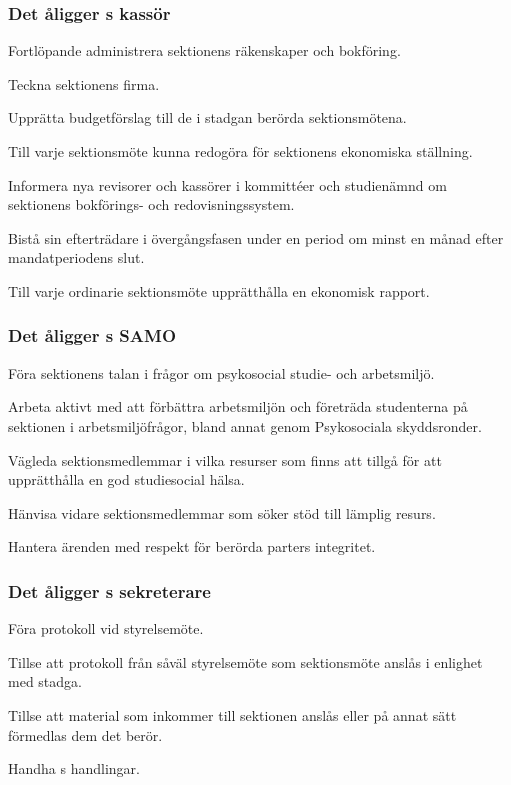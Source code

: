 \subsubsection{Det åligger \STYRIT{}s kassör}
\begin{att}
	\item Fortlöpande administrera sektionens räkenskaper och bokföring.
	\item Teckna sektionens firma.
	\item Upprätta budgetförslag till de i stadgan berörda sektionsmötena.
	\item Till varje sektionsmöte kunna redogöra för sektionens ekonomiska ställning.
	\item Informera nya revisorer och kassörer i kommittéer och studienämnd om sektionens bokförings- och redovisningssystem.
    \item Bistå sin efterträdare i övergångsfasen under en period om minst en månad efter mandatperiodens slut.
    \item Till varje ordinarie sektionsmöte upprätthålla en ekonomisk rapport.
\end{att}

\subsubsection{Det åligger \STYRIT{}s SAMO}
\begin{att}
    \item Föra sektionens talan i frågor om psykosocial studie- och arbetsmiljö.
    \item Arbeta aktivt med att förbättra arbetsmiljön och företräda studenterna på sektionen i arbetsmiljöfrågor, bland annat genom Psykosociala skyddsronder.
    \item Vägleda sektionsmedlemmar i vilka resurser som finns att tillgå för att upprätthålla en god studiesocial hälsa.
    \item Hänvisa vidare sektionsmedlemmar som söker stöd till lämplig resurs.
    \item Hantera ärenden med respekt för berörda parters integritet.
\end{att}
 
\subsubsection{Det åligger \STYRIT{}s sekreterare}
\begin{att}
	\item Föra protokoll vid styrelsemöte.
	\item Tillse att protokoll från såväl styrelsemöte som sektionsmöte anslås i enlighet med stadga.
	\item Tillse att material som inkommer till sektionen anslås eller på annat sätt förmedlas dem det berör.
	\item Handha \STYRIT{}s handlingar.
\end{att}

